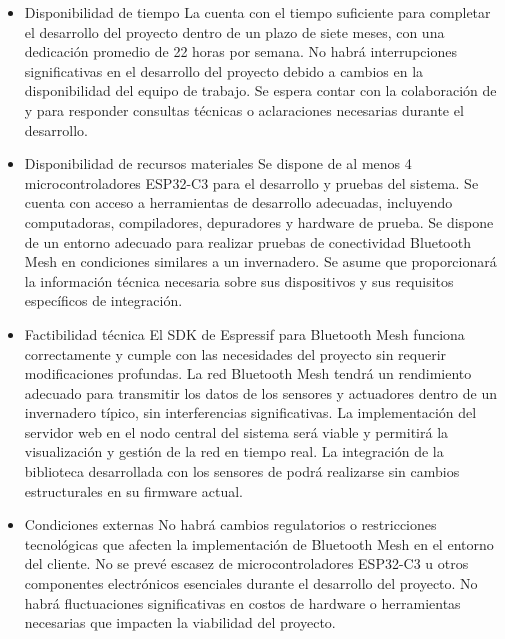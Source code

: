 \documentclass[
11pt, %
]{charter}
\begin{document}
\begin{itemize}
\item Disponibilidad de tiempo
\subitem La {\authorname} cuenta con el tiempo suficiente para completar el desarrollo del proyecto dentro de un plazo de siete meses, con una dedicación promedio de 22 horas por semana. 
\subitem No habrá interrupciones significativas en el desarrollo del proyecto debido a cambios en la disponibilidad del equipo de trabajo.
\subitem Se espera contar con la colaboración de {\clientename} y {\empclientename} para responder consultas técnicas o aclaraciones necesarias durante el desarrollo.

\item Disponibilidad de recursos materiales
\subitem Se dispone de al menos 4 microcontroladores ESP32-C3 para el desarrollo y pruebas del sistema.
\subitem Se cuenta con acceso a herramientas de desarrollo adecuadas, incluyendo computadoras, compiladores, depuradores y hardware de prueba.
\subitem Se dispone de un entorno adecuado para realizar pruebas de conectividad Bluetooth Mesh en condiciones similares a un invernadero.
\subitem Se asume que {\empclientename} proporcionará la información técnica necesaria sobre sus dispositivos y sus requisitos específicos de integración.

\item Factibilidad técnica
\subitem El SDK de Espressif para Bluetooth Mesh funciona correctamente y cumple con las necesidades del proyecto sin requerir modificaciones profundas.
\subitem La red Bluetooth Mesh tendrá un rendimiento adecuado para transmitir los datos de los sensores y actuadores dentro de un invernadero típico, sin interferencias significativas.
\subitem La implementación del servidor web en el nodo central del sistema será viable y permitirá la visualización y gestión de la red en tiempo real.
\subitem La integración de la biblioteca desarrollada con los sensores de {\empclientename} podrá realizarse sin cambios estructurales en su firmware actual.

\item Condiciones externas
\subitem No habrá cambios regulatorios o restricciones tecnológicas que afecten la implementación de Bluetooth Mesh en el entorno del cliente.
\subitem No se prevé escasez de microcontroladores ESP32-C3 u otros componentes electrónicos esenciales durante el desarrollo del proyecto.
\subitem No habrá fluctuaciones significativas en costos de hardware o herramientas necesarias que impacten la viabilidad del proyecto.
\end{itemize}
\end{document}
